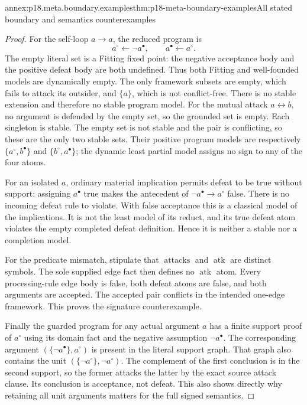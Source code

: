 \begin{annexitem}{annex:p18.meta.boundary.examples}{thm:p18-meta-boundary-examples}{All stated boundary and semantics counterexamples}
\begin{proof}
For the self-loop \(a\to a\), the reduced program is
\[
                    a^\circ\leftarrow\neg a^\bullet,\qquad
                    a^\bullet\leftarrow a^\circ.
\]
The empty literal set is a Fitting fixed point:
the negative acceptance body and the positive
defeat body are both undefined. Thus both
Fitting and well-founded models are dynamically
empty. The only framework subsets are empty,
which fails to attack its outsider, and
\(\{a\}\), which is not conflict-free.
There is no stable extension and therefore
no stable program model. For the mutual attack
\(a\leftrightarrow b\), no argument is defended
by the empty set, so the grounded set is empty.
Each singleton is stable. The empty set is
not stable and the pair is conflicting, so
these are the only two stable sets.
Their positive program models are respectively
\(\{a^\circ,b^\bullet\}\) and
\(\{b^\circ,a^\bullet\}\); the dynamic least
partial model assigns no sign to any of the
four atoms.

For an isolated \(a\), ordinary material
implication permits defeat to be true without
support: assigning \(a^\bullet\) true makes
the antecedent of
\(\neg a^\bullet\mathbin{\to}a^\circ\) false.
There is no incoming defeat rule to violate.
With false acceptance this is a classical
model of the implications. It is not the
least model of its reduct, and its true
defeat atom violates the empty completed
defeat definition. Hence it is neither a
stable nor a completion model.

For the predicate mismatch, stipulate that
\(\operatorname{attacks}\) and
\(\operatorname{atk}\) are distinct symbols.
The sole supplied edge fact then defines
no \(\operatorname{atk}\) atom. Every
processing-rule edge body is false, both
defeat atoms are false, and both arguments
are accepted. The accepted pair conflicts
in the intended one-edge framework.
This proves the signature counterexample.

Finally the guarded program for any actual
argument \(a\) has a finite support proof of
\(a^\circ\) using its domain fact and the
negative assumption \(\neg a^\bullet\).
The corresponding argument
\((\{\neg a^\bullet\},a^\circ)\) is present
in the literal support graph. That graph
also contains the unit
\((\{\neg a^\circ\},\neg a^\circ)\).
The complement of the first conclusion is
in the second support, so the former attacks
the latter by the exact source attack clause.
Its conclusion is acceptance, not defeat.
This also shows directly why retaining
all unit arguments matters for the full
signed semantics.
\end{proof}
\end{annexitem}

